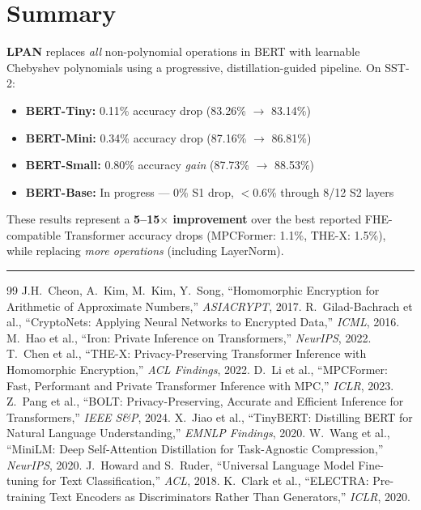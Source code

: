 \documentclass[12pt, a4paper]{article}
\begin{document}
\section{Summary}

\begin{mdframed}[backgroundcolor=green!5, linecolor=contributiongreen, linewidth=2pt,
  topline=false, rightline=false, bottomline=false,
  innerleftmargin=12pt, innerrightmargin=12pt,
  innertopmargin=10pt, innerbottommargin=10pt]
\textbf{LPAN} replaces \emph{all} non-polynomial operations in BERT with learnable Chebyshev polynomials using a progressive, distillation-guided pipeline. On SST-2:
\begin{itemize}[leftmargin=1.5em]
  \item \textbf{BERT-Tiny:} 0.11\% accuracy drop (83.26\% $\to$ 83.14\%)
  \item \textbf{BERT-Mini:} 0.34\% accuracy drop (87.16\% $\to$ 86.81\%)
  \item \textbf{BERT-Small:} 0.80\% accuracy \emph{gain} (87.73\% $\to$ 88.53\%)
  \item \textbf{BERT-Base:} In progress --- 0\% S1 drop, $<$0.6\% through 8/12 S2 layers
\end{itemize}
These results represent a \textbf{5--15$\times$ improvement} over the best reported FHE-compatible Transformer accuracy drops (MPCFormer: 1.1\%, THE-X: 1.5\%), while replacing \emph{more operations} (including LayerNorm).
\end{mdframed}

\medskip
\noindent\rule{\textwidth}{0.5pt}
{\footnotesize
\begin{thebibliography}{99}
 J.H.\ Cheon, A.\ Kim, M.\ Kim, Y.\ Song, ``Homomorphic Encryption for Arithmetic of Approximate Numbers,'' \textit{ASIACRYPT}, 2017.
 R.\ Gilad-Bachrach et al., ``CryptoNets: Applying Neural Networks to Encrypted Data,'' \textit{ICML}, 2016.
 M.\ Hao et al., ``Iron: Private Inference on Transformers,'' \textit{NeurIPS}, 2022.
 T.\ Chen et al., ``THE-X: Privacy-Preserving Transformer Inference with Homomorphic Encryption,'' \textit{ACL Findings}, 2022.
 D.\ Li et al., ``MPCFormer: Fast, Performant and Private Transformer Inference with MPC,'' \textit{ICLR}, 2023.
 Z.\ Pang et al., ``BOLT: Privacy-Preserving, Accurate and Efficient Inference for Transformers,'' \textit{IEEE S\&P}, 2024.
 X.\ Jiao et al., ``TinyBERT: Distilling BERT for Natural Language Understanding,'' \textit{EMNLP Findings}, 2020.
 W.\ Wang et al., ``MiniLM: Deep Self-Attention Distillation for Task-Agnostic Compression,'' \textit{NeurIPS}, 2020.
 J.\ Howard and S.\ Ruder, ``Universal Language Model Fine-tuning for Text Classification,'' \textit{ACL}, 2018.
 K.\ Clark et al., ``ELECTRA: Pre-training Text Encoders as Discriminators Rather Than Generators,'' \textit{ICLR}, 2020.
\end{thebibliography}
}
\end{document}
